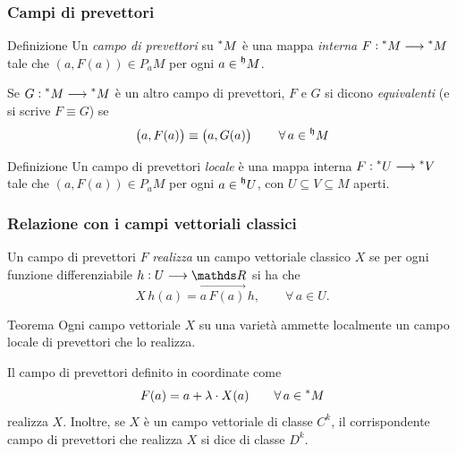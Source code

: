 \documentclass{beamer}
\newenvironment{definizioneb}{\begin{block}{Definizione}}{\end{block}}
\newenvironment{teoremab}{\begin{alertblock}{Teorema}}{\end{alertblock}}
\begin{document}
\begin{frame}
    \frametitle{Campi di prevettori}
    \begin{definizioneb}
        Un \emph{campo di prevettori} su $ \prescript{*}{}{M} $ è una mappa \emph{interna} $ F: \prescript{*}{}{M} \longrightarrow \prescript{*}{}{M} $ tale che $ \left(a, F(a)\right) \in P_{a}M  $ per ogni $ a \in \prescript{\mathfrak{h}}{}{M} $. 
    \end{definizioneb}

    Se $ G: \prescript{*}{}{M} \longrightarrow \prescript{*}{}{M} $ è un altro campo di prevettori, $ F $ e $ G $ si dicono \emph{equivalenti} (e si scrive $ F\equiv G $) se \begin{equation*}
        \left(a,F(a)\right) \equiv \left(a,G(a)\right)\qquad \forall\,a \in \prescript{\mathfrak{h}}{}{M}
    \end{equation*}

    \begin{definizioneb}
        Un campo di prevettori \emph{locale} è una mappa interna $F: \prescript{*}{}{U} \longrightarrow \prescript{*}{}{V}$ tale che  $ \left(a, F(a)\right) \in P_{a}M  $ per ogni $ a \in \prescript{\mathfrak{h}}{}{U} $, con $ U \subseteq V \subseteq M $ aperti.
    \end{definizioneb}

\end{frame}


\begin{frame}
    \frametitle{Relazione con i campi vettoriali classici}

    Un campo di prevettori $ F $ \emph{realizza} un campo vettoriale classico $ X $ se per ogni funzione differenziabile $ h : U \longrightarrow \R $ si ha che \begin{equation*}
        X\,h(a) = \vec{a\, F(a)}\,h,\qquad \forall\, a \in U.
    \end{equation*} 

    \begin{teoremab}
        Ogni campo vettoriale $ X $ su una varietà ammette localmente un campo locale di prevettori che lo realizza.
    \end{teoremab}

    Il campo di prevettori definito in coordinate come \begin{equation*}
        F(a) = a + \lambda \cdot X(a) \qquad\forall\, a \in \prescript{*}{}{M}
    \end{equation*}realizza $ X $. Inoltre, se $ X $ è un campo vettoriale di classe $ C^{k} $, il corrispondente campo di prevettori che realizza $ X $ si dice di classe $ D^{k} $.

\end{frame}
\end{document}
